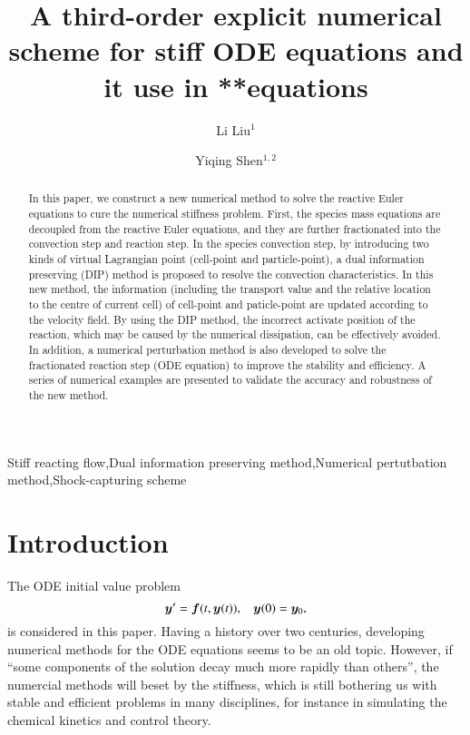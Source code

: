 \documentclass[review]{elsarticle}
\theoremstyle{plain}\newtheorem{definition}{\sc{Definition}}
\theoremstyle{defination}\newtheorem{example}{Example}[section]
\numberwithin{equation}{section}
\numberwithin{table}{section}
\begin{document}
\title{A third-order explicit numerical scheme for stiff ODE equations and it use in **equations }
\author{Li Liu$^1$}
\author{Yiqing Shen$^{1,2}$ }
\address{$^1$LHD, Institute of Mechanics, Chinese Academy of Sciences, Beijing 100190, China}
\address{$^2$School of Engineering Science, University of Chinese Academy of Sciences, Beijing 100049, China}
{
\begin{abstract}
In this paper, we construct a new numerical method to solve the reactive Euler equations to cure the numerical stiffness problem.
First, the species mass equations are decoupled from the reactive Euler equations, and they are further fractionated into the convection step and reaction step.
 In the species convection
step, by introducing two kinds of virtual Lagrangian point (cell-point and particle-point), a dual information preserving (DIP) method is proposed to resolve the convection characteristics. In this new method, the 
 information (including the transport value and the relative location to the centre of current cell) of cell-point and paticle-point are updated according to the velocity field. By using the DIP method, the incorrect activate position of the reaction, which may be caused by the numerical dissipation, can be effectively avoided. In addition, a numerical perturbation method is also developed to solve the fractionated reaction step (ODE equation) to improve the stability and efficiency. A series of numerical examples are presented to validate the accuracy and robustness of the new method. 
\end{abstract}
\begin{keyword}
 Stiff reacting flow\sep  Dual information preserving method\sep Numerical pertutbation method\sep Shock-capturing scheme 
\end{keyword}

\maketitle
\section{Introduction}

The ODE initial value problem
\begin{equation}\label{eq:ode}
  \bm{y}'= \bm{f}(t,\bm{y}(t)), \hspace{0.3cm} \bm{y}(0)= \bm{y}_0,
  \end{equation}
  is considered in this paper. 
  Having a history over two centuries, developing numerical methods for the ODE equations seems to be an old topic.  However, if ``some components of the solution decay much more rapidly than others''\cite{lambert1991numerical}, the numercial methods will beset by the stiffness, which is still bothering us with stable and efficient problems in many disciplines, for instance in simulating the  chemical kinetics and control theory.

}
\end{document}
